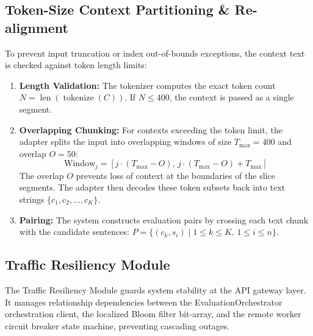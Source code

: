 \documentclass[11pt,a4paper]{article}
\theoremstyle{plain}
\theoremstyle{definition}
\theoremstyle{remark}
\begin{document}
\subsection{Token-Size Context Partitioning \& Re-alignment}
To prevent input truncation or index out-of-bounds exceptions, the context text is checked against token length limits:
\begin{enumerate}
    \item \textbf{Length Validation:} The tokenizer computes the exact token count $N = \operatorname{len}(\operatorname{tokenize}(C))$. If $N \le 400$, the context is passed as a single segment.
    \item \textbf{Overlapping Chunking:} For contexts exceeding the token limit, the adapter splits the input into overlapping windows of size $T_{\max} = 400$ and overlap $O = 50$:
    \begin{equation}
        \text{Window}_j = [ j \cdot (T_{\max} - O), \, j \cdot (T_{\max} - O) + T_{\max} ]
    \end{equation}
    The overlap $O$ prevents loss of context at the boundaries of the slice segments. The adapter then decodes these token subsets back into text strings $\{c_1, c_2, \dots, c_K\}$.
    \item \textbf{Pairing:} The system constructs evaluation pairs by crossing each text chunk with the candidate sentences: $P = \{(c_k, s_i) \mid 1 \le k \le K, \, 1 \le i \le n\}$.
\end{enumerate}

\subsection{Traffic Resiliency Module}
The Traffic Resiliency Module guards system stability at the API gateway layer. It manages relationship dependencies between the EvaluationOrchestrator orchestration client, the localized Bloom filter bit-array, and the remote worker circuit breaker state machine, preventing cascading outages.
\end{document}
